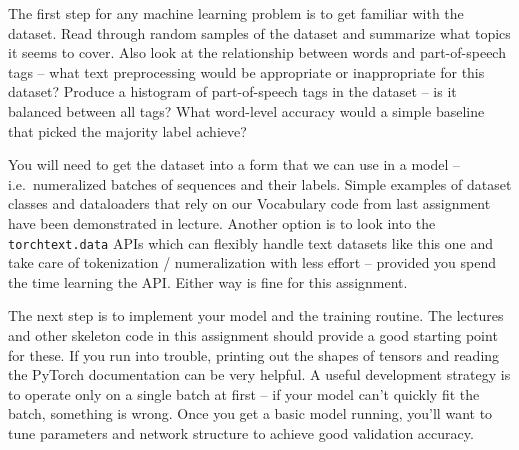 \documentclass[a4paper,10pt]{article}
\begin{document}
\vspace{5pt}
\begin{taskbox}
 The first step for any machine learning problem is to get familiar with the dataset. Read through random samples of the dataset and summarize what topics it seems to cover. Also look at the relationship between words and part-of-speech tags -- what text preprocessing would be appropriate or inappropriate for this dataset? Produce a histogram of part-of-speech tags in the dataset -- is it balanced between all tags? What word-level accuracy would a simple baseline that  picked the majority label achieve?
\end{taskbox}
\vspace{5pt}


You will need to get the dataset into a form that we can use in a model -- i.e.~numeralized batches of sequences and their labels. Simple examples of dataset classes and dataloaders that rely on our Vocabulary code from last assignment have been demonstrated in lecture. Another option is to look into the \texttt{torchtext.data} APIs which can flexibly handle text datasets like this one and take care of tokenization / numeralization with less effort -- provided you spend the time learning the API. Either way is fine for this assignment.

The next step is to implement your model and the training routine. The lectures and other skeleton code in this assignment should provide a good starting point for these. If you run into trouble, printing out the shapes of tensors and reading the PyTorch documentation can be very helpful. A useful development strategy is to operate only on a single batch at first -- if your model can't quickly fit the batch, something is wrong. Once you get a basic model running, you'll want to tune parameters and network structure to achieve good validation accuracy. 
\end{document}

